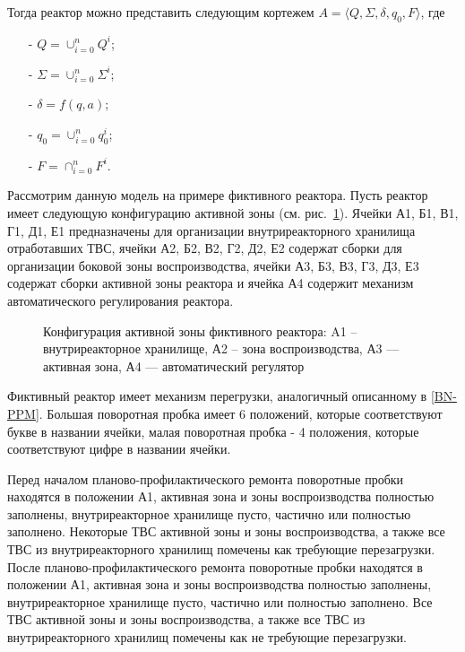 Тогда реактор можно представить следующим кортежем $A = \langle Q, \Sigma, \delta, q_0, F  \rangle$, где
\begin{itemize}
 \item [-] $Q = \cup_{i=0}^n Q^i$;
 \item [-] $\Sigma = \cup_{i=0}^n \Sigma^i$;
 \item [-] $\delta = f (q, a)$;
 \item [-] $q_0 = \cup_{i=0}^n q_0^i$;
 \item [-] $F = \cap_{i=0}^n F^i$.
\end{itemize}

Рассмотрим данную модель на примере фиктивного реактора.
Пусть реактор имеет следующую конфигурацию активной зоны (см. рис.~\ref{pic:fict-grid}).
Ячейки А1, Б1, В1, Г1, Д1, Е1 предназначены для организации внутриреакторного хранилища отработавших ТВС, 
ячейки А2, Б2, В2, Г2, Д2, Е2 содержат сборки для организации боковой зоны воспроизводства, ячейки А3, Б3, В3, Г3, Д3, Е3 содержат сборки активной зоны реактора и ячейка А4 содержит механизм автоматического регулирования реактора.
\begin{figure}[ht]
\caption[Конфигурация активной зоны фиктивного реактора]{Конфигурация активной зоны фиктивного реактора: A1 -- внутриреакторное хранилище, А2 -- зона воспроизводства, А3 --- активная зона, А4 --- автоматический регулятор}
\label{pic:fict-grid}
\end{figure}

Фиктивный реактор имеет механизм перегрузки, аналогичный описанному в \ref{BN-PPM}.
Большая поворотная пробка имеет 6 положений, которые соответствуют букве в названии ячейки, малая поворотная пробка - 4 положения, которые соответствуют цифре в названии ячейки.

Перед началом планово-профилактического ремонта поворотные пробки находятся в положении А1, активная зона и зоны воспроизводства  полностью заполнены, внутриреакторное хранилище пусто, частично или полностью заполнено.
Некоторые ТВС активной зоны и зоны воспроизводства, а также все ТВС из внутриреакторного хранилищ помечены как требующие перезагрузки. 
После планово-профилактического ремонта поворотные пробки находятся в положении А1, активная зона и зоны воспроизводства  полностью заполнены, внутриреакторное хранилище пусто, частично или полностью заполнено.
Все ТВС активной зоны и зоны воспроизводства, а также все ТВС из внутриреакторного хранилищ помечены как не требующие перезагрузки. 


